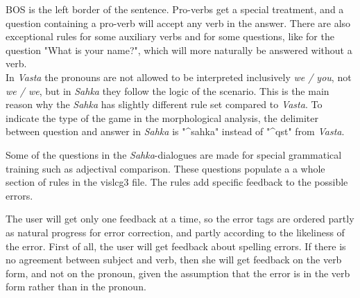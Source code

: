 \documentclass[11pt]{article}
\begin{document}
BOS is the left border of the sentence. Pro-verbs get a special treatment, and a question containing a pro-verb will accept any verb in the answer. There are also exceptional rules for some auxiliary verbs and for some questions, like for the question "What is your name?", which will more naturally be answered without a verb. \\




In \textit{Vasta} the pronouns are not allowed to be interpreted inclusively \textit{we / you}, not \textit{we / we}, but in \textit{Sahka} they follow the logic of the scenario. This is the main reason why the \textit{Sahka} has slightly different rule set compared to \textit{Vasta}. To indicate the type of the game in the morphological analysis, the delimiter between question and answer in \textit{Sahka} is "\^{}sahka" instead of "\^{}qst" from \textit{Vasta}.

Some of the questions in the \textit{Sahka}-dialogues are made for special grammatical training such as adjectival comparison. These questions populate a a whole section of rules in the vislcg3 file. The rules add specific feedback to the possible errors.

The user will get only one feedback at a time, so the error tags are ordered partly as natural progress for error correction, and partly according to the likeliness of the error. First of all, the user will get feedback about spelling errors. If there is no agreement between subject and verb, then she will get feedback on the verb form, and not on the pronoun, given the assumption that the error is in the verb form rather than in the pronoun.
\end{document}
